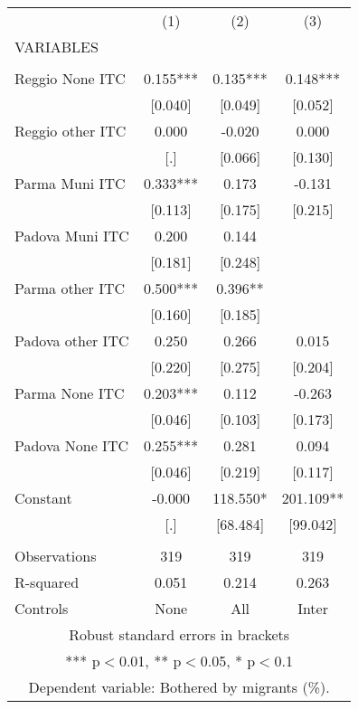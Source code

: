 \begin{tabular}{lccc} \hline
 & (1) & (2) & (3) \\
VARIABLES &  &  &  \\ \hline
 &  &  &  \\
Reggio None ITC & 0.155*** & 0.135*** & 0.148*** \\
 & [0.040] & [0.049] & [0.052] \\
Reggio other ITC & 0.000 & -0.020 & 0.000 \\
 & [.] & [0.066] & [0.130] \\
Parma Muni ITC & 0.333*** & 0.173 & -0.131 \\
 & [0.113] & [0.175] & [0.215] \\
Padova Muni ITC & 0.200 & 0.144 &  \\
 & [0.181] & [0.248] &  \\
Parma other ITC & 0.500*** & 0.396** &  \\
 & [0.160] & [0.185] &  \\
Padova other ITC & 0.250 & 0.266 & 0.015 \\
 & [0.220] & [0.275] & [0.204] \\
Parma None ITC & 0.203*** & 0.112 & -0.263 \\
 & [0.046] & [0.103] & [0.173] \\
Padova None ITC & 0.255*** & 0.281 & 0.094 \\
 & [0.046] & [0.219] & [0.117] \\
Constant & -0.000 & 118.550* & 201.109** \\
 & [.] & [68.484] & [99.042] \\
 &  &  &  \\
Observations & 319 & 319 & 319 \\
R-squared & 0.051 & 0.214 & 0.263 \\
 Controls & None & All & Inter \\ \hline
\multicolumn{4}{c}{ Robust standard errors in brackets} \\
\multicolumn{4}{c}{ *** p$<$0.01, ** p$<$0.05, * p$<$0.1} \\
\multicolumn{4}{c}{ Dependent variable: Bothered by migrants (\%).} \\
\end{tabular}

